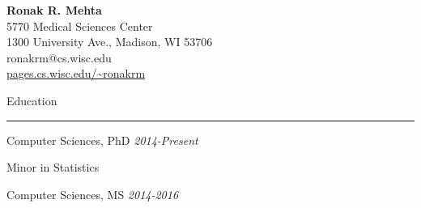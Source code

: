 \documentclass[]{article}
\title{}
\author{}
\date{}
\begin{document}
\begin{center}
	{\Huge\bf Ronak R. Mehta} \\
	\vspace{5pt}
	{\large 5770 Medical Sciences Center \\
	1300 University Ave., Madison, WI 53706 \\
	ronakrm@cs.wisc.edu \\
	\url{pages.cs.wisc.edu/~ronakrm} }
\end{center}



\vspace{20pt}
{\LARGE Education}
\vspace{3pt}
\hrule
\vspace{10pt}


	{Computer Sciences, PhD \hfill \textit{2014-Present}}
	
	\qquad Minor in Statistics
		
	{Computer Sciences, MS \hfill \textit{2014-2016}}
	
\end{document}
